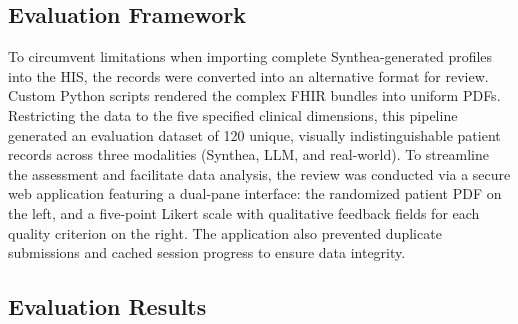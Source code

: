 \subsection*{Evaluation Framework}
\begin{sloppypar}
To circumvent limitations when importing complete Synthea-generated profiles into the HIS, the records were converted into an alternative format for review. Custom Python scripts rendered the complex FHIR bundles into uniform PDFs. Restricting the data to the five specified clinical dimensions, this pipeline generated an evaluation dataset of 120 unique, visually indistinguishable patient records across three modalities (Synthea, LLM, and real-world). To streamline the assessment and facilitate data analysis, the review was conducted via a secure web application featuring a dual-pane interface: the randomized patient PDF on the left, and a five-point Likert scale with qualitative feedback fields for each quality criterion on the right. The application also prevented duplicate submissions and cached session progress to ensure data integrity.
\end{sloppypar}
\subsection*{Evaluation Results}
